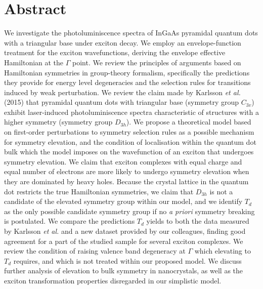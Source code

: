 \documentclass[12pt]{article}
\begin{document}







\section{Abstract}
We investigate the photoluminiscence spectra of InGaAs pyramidal quantum dots with a triangular base under exciton decay. We employ an envelope-function treatment for the exciton wavefunctions, deriving the envelope effective Hamiltonian at the $\Gamma$ point. We review the principles of arguments based on Hamiltonian symmetries in group-theory formalism, specifically the predictions they provide for energy level degeneracies and the selection rules for transitions induced by weak perturbation. We review the claim made by Karlsson \textit{et al.} (2015) that pyramidal quantum dots with triangular base (symmetry group $C_{3v}$) exhibit laser-induced photoluminiscence spectra characteristic of structures with a higher symmetry (symmetry group $D_{3h}$). We propose a theoretical model based on first-order perturbations to symmetry selection rules as a possible mechanism for symmetry elevation, and the condition of localisation within the quantum dot bulk which the model imposes on the wavefunction of an exciton that undergoes symmetry elevation. We claim that exciton complexes with equal charge and equal number of electrons are more likely to undergo symmetry elevation when they are dominated by heavy holes. Because the crystal lattice in the quantum dot restricts the true Hamiltonian symmetries, we claim that $D_{3h}$ is not a candidate of the elevated symmetry group within our model, and we identify $T_d$ as the only possible candidate symmetry group if no \textit{a priori} symmetry breaking is postulated. We compare the predictions $T_d$ yields to both the data measured by Karlsson \textit{et al.} and a new dataset provided by our colleagues, finding good agreement for a part of the studied sample for several exciton complexes. We review the condition of raising valence band degeneracy at $\Gamma$ which elevating to $T_d$ requires, and which is not treated within our proposed model. We discuss further analysis of elevation to bulk symmetry in nanocrystals, as well as the exciton transformation properties disregarded in our simplistic model.
\end{document}
